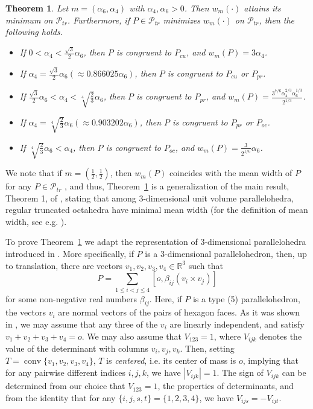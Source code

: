 \documentclass[twoside]{amsart}
\newtheorem{thm}{Theorem}
\theoremstyle{definition}
\renewcommand{\Re}{\mathbb R}
\newcommand{\PP}{\mathcal{P}}
\DeclareMathOperator{\conv}{conv}
\begin{document}
\begin{thm}\label{thm:2}
Let $m=(\alpha_6,\alpha_4)$ with $\alpha_4, \alpha_6 > 0$. Then $w_m(\cdot)$ attains its minimum on $\PP_{tr}$. Furthermore, if $P \in \PP_{tr}$ minimizes $w_m(\cdot)$ on $\PP_{tr}$, then the following holds.
\begin{itemize}
\item[(a)] If $0 < \alpha_4 < \frac{\sqrt{3}}{2} \alpha_6$, then $P$ is congruent to $P_{cu}$, and $w_m(P) = 3 \alpha_4$.
\item[(b)] If $\alpha_{4} = \frac{\sqrt{3}}{2} \alpha_6 ( \approx 0.866025 \alpha_6)$, then $P$ is congruent to $P_{cu}$ or $P_{pr}$.
\item[(c)] If $\frac{\sqrt{3}}{2} \alpha_6 < \alpha_4 < \sqrt[4]{\frac{2}{3}} \alpha_6$, then $P$ is congruent to $P_{pr}$, and $w_m(P)= \frac{3^{7/6} \alpha_4^{2/3} \alpha_6^{1/3}}{2^{1/3}}$.
\item[(d)] If $\alpha_4 = \sqrt[4]{\frac{2}{3}} \alpha_6 (\approx 0.903202 \alpha_6)$, then $P$ is congruent to $P_{pr}$ or $P_{oc}$.
\item[(e)] If $\sqrt[4]{\frac{2}{3}} \alpha_6 < \alpha_4$, then $P$ is congruent to $P_{oc}$, and $w_m(P)=\frac{3}{2^{1/6}} \alpha_6$.
\end{itemize}
\end{thm}

We note that if $m=\left( \frac{1}{2}, \frac{1}{2} \right)$, then $w_m(P)$ coincides with the mean width of $P$ for any $P \in \PP_{tr}$ \cite[Remark 3]{Langi}, and thus, Theorem~\ref{thm:2} is a generalization of the main result, Theorem 1, of \cite{Langi}, stating that among $3$-dimensional unit volume parallelohedra, regular truncated octahedra have minimal mean width (for the definition of mean width, see e.g. \cite{Gardner, Schneider}).

To prove Theorem~\ref{thm:2} we adapt the representation of $3$-dimensional parallelohedra introduced in \cite{Langi}.
More specifically, if $P$ is a $3$-dimensional parallelohedron, then, up to translation, there are vectors $v_1, v_2,v_3, v_4 \in \Re^3$ such that
\begin{equation}\label{eq:representation}
P = \sum_{1 \leq i < j \leq 4} [o, \beta_{ij}(v_i \times v_j)]
\end{equation}
for some non-negative real numbers $\beta_{ij}$. Here, if $P$ is a type (5) parallelohedron, the vectors $v_i$ are normal vectors of the pairs of hexagon faces.
As it was shown in \cite{Langi}, we may assume that any three of the $v_i$ are linearly independent, and satisfy $v_1+v_2+v_3+v_4=o$. We may also assume that $V_{123}=1$, where $V_{ijk}$ denotes the value of the determinant with columns $v_i, v_j, v_k$. Then, setting $T= \conv \{ v_1, v_2, v_3, v_4 \}$, $T$ is \emph{centered}, i.e. its center of mass is $o$, implying that for any pairwise different indices $i,j,k$, we have $|V_{ijk}| = 1$. The sign of $V_{ijk}$ can be determined from our choice that $V_{123}=1$, the properties of determinants, and from the identity that for any $\{i,j,s,t\} = \{ 1,2,3,4\}$, we have $V_{ijs}=-V_{ijt}$.
\end{document}
